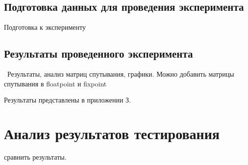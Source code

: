 \subsection{Подготовка данных для проведения эксперимента}\par
\hspace*{12.5 mm}Подготовка к эксперименту

\subsection{Результаты проведенного эксперимента}\
\hspace*{12.5 mm}Результаты, анализ матриц спутывания, графики.
Можно добавить матрицы спутывания в floatpoint и fixpoint 

Результаты представлены в приложении З.

\section{Анализ результатов тестирования}
\hspace*{12.5 mm}сравнить результаты.
